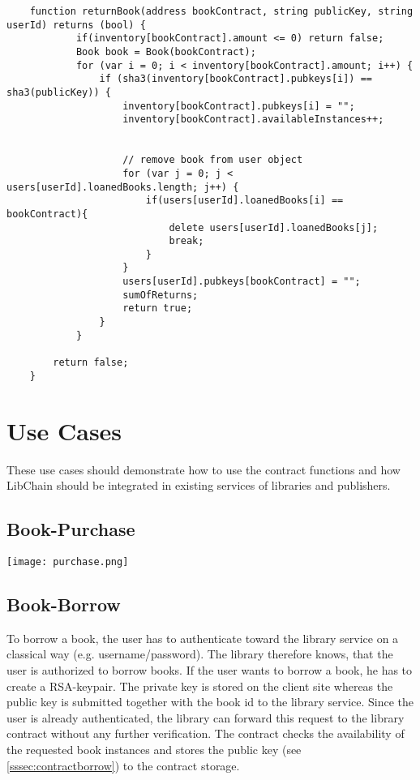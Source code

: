 \begin{lstlisting}
	function returnBook(address bookContract, string publicKey, string userId) returns (bool) {
    		if(inventory[bookContract].amount <= 0) return false;
    		Book book = Book(bookContract);
            for (var i = 0; i < inventory[bookContract].amount; i++) {
                if (sha3(inventory[bookContract].pubkeys[i]) == sha3(publicKey)) {
                    inventory[bookContract].pubkeys[i] = "";
                    inventory[bookContract].availableInstances++;


                    // remove book from user object
                    for (var j = 0; j < users[userId].loanedBooks.length; j++) {
                        if(users[userId].loanedBooks[i] == bookContract){
                            delete users[userId].loanedBooks[j];
                            break;
                        }
                    }
                    users[userId].pubkeys[bookContract] = "";
                    sumOfReturns;
                    return true;
                }
            }

        return false;
    }
\end{lstlisting}

\section{Use Cases}
These use cases should demonstrate how to use the contract functions and how LibChain should be integrated in existing services of libraries and publishers.

\subsection{Book-Purchase}
\vspace{0.3cm}
\texttt{[image: purchase.png]}
\subsection{Book-Borrow}
To borrow a book, the user has to authenticate toward the library service on a classical way (e.g. username/password). The library therefore knows, that the user is authorized to borrow books. If the user wants to borrow a book, he has to create a RSA-keypair. The private key is stored on the client site whereas the public key is submitted together with the book id to the library service.
Since the user is already authenticated, the library can forward this request to the library contract without any further verification.
The contract checks the availability of the requested book instances and stores the public key (see \ref{sssec:contractborrow}) to the contract storage.

